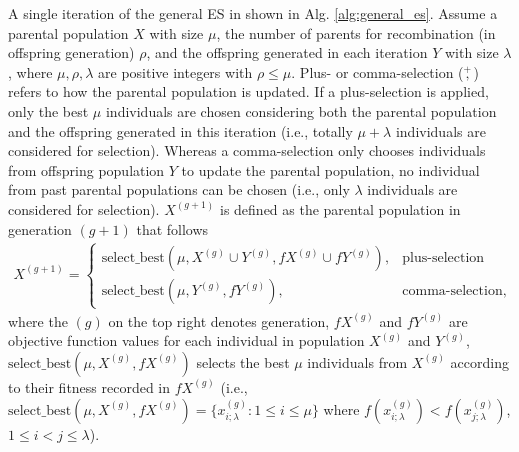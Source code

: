 A single iteration of the general ES in shown in Alg. \ref{alg:general_es}. Assume a parental population $X$ with size $\mu$, the number of parents for recombination (in offspring generation) $\rho$, and the offspring generated in each iteration $Y$ with size $\lambda$, where $\mu,\rho,\lambda$ are positive integers with $\rho \leq \mu$. Plus- or comma-selection ($\overset{+}{,}$) refers to how the parental population is updated. If a plus-selection is applied, only the best $\mu$ individuals are chosen considering both the parental population and the offspring generated in this iteration (i.e., totally $\mu+\lambda$ individuals are considered for selection). Whereas a comma-selection only chooses individuals from offspring population $Y$ to update the parental population, no individual from past parental populations can be chosen (i.e., only $\lambda$ individuals are considered for selection). $X^{(g+1)}$ is defined as the parental population in generation $(g+1)$ that follows
\begin{align}
X^{(g+1)} = 
\begin{cases}
\text{select\_best}(\mu,X^{(g)}\cup Y^{(g)},fX^{(g)} \cup fY^{(g)}), & \text{plus-selection}\\
\text{select\_best}(\mu,Y^{(g)},fY^{(g)}) , & \text{comma-selection},
\end{cases}
\end{align}
where the $(g)$ on the top right denotes generation, $fX^{(g)}$ and $fY^{(g)}$ are objective function values for each individual in population $X^{(g)}$ and $Y^{(g)}$, $\text{select\_best}(\mu,X^{(g)},fX^{(g)})$ selects the best $\mu$ individuals from $X^{(g)}$ according to their fitness recorded in $fX^{(g)}$ (i.e., $\text{select\_best}(\mu,X^{(g)},fX^{(g)}) = \{x_{i;\lambda}^{(g)}: 1 \leq i \leq \mu \}$ where $f(x_{i;\lambda}^{(g)}) < f(x_{j;\lambda}^{(g)})$, $1 \leq i < j \leq \lambda$).

